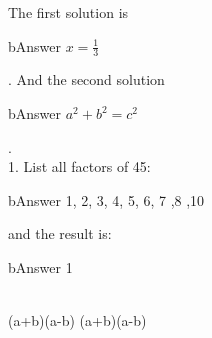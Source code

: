 The first solution is \begin{envAnsBox}[5cm]{bAnswer} $x=\frac{1}{3}$ \end{envAnsBox}. And the second solution \begin{envAnsBox}[5cm]{bAnswer} $a^2 + b^2 = c^2$ \end{envAnsBox}. \\



1. List all factors of 45:  \begin{envAnsLine}[5cm][dashed]{bAnswer} 1, 2, 3, 4, 5, 6, 7 ,8 ,10  \end{envAnsLine}  and the result is:  \begin{envAnsLine}[3cm][dashed]{bAnswer} 1   \end{envAnsLine} \\

(a+b)(a-b)            (a+b)(a-b)    